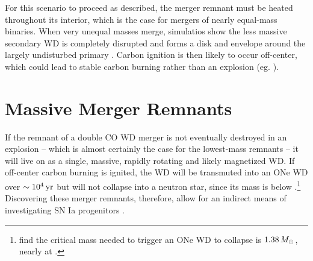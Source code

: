 For this scenario to proceed as described, the merger remnant must be heated throughout its interior, which is the case for mergers of nearly equal-mass binaries.  When very unequal masses merge, simulatios show the less massive secondary WD is completely disrupted and forms a disk and envelope around the largely undisturbed primary \citep{loreig09}.  Carbon ignition is then likely to occur off-center, which could lead to stable carbon burning rather than an explosion (eg. \citealt{yoonpr07, shen+12}).

\section{Massive Merger Remnants}
\label{sec:c1_hotdqs}

If the remnant of a double CO WD merger is not eventually destroyed in an explosion -- which is almost certainly the case for the lowest-mass remnants -- it will live on as a single, massive, rapidly rotating and likely magnetized WD.  If off-center carbon burning is ignited, the WD will be transmuted into an ONe WD over $\sim10^4\,\mathrm{yr}$ \citep{nomoi85, shen+12} but will not collapse into a neutron star, since its mass is below \Mch.\footnote{\cite{schwqb15} find the critical mass needed to trigger an ONe WD to collapse is $1.38\,\Msun$, nearly at \Mch.}  Discovering these merger remnants, therefore, allow for an indirect means of investigating SN Ia progenitors \citep{dunlc15}.



